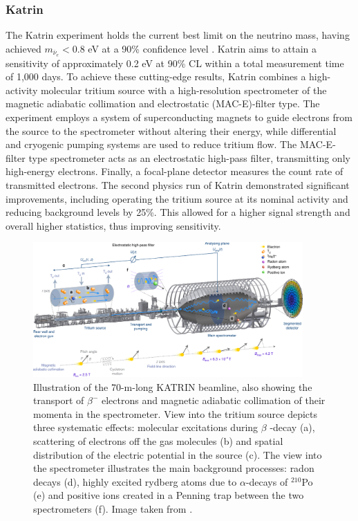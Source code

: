\subsubsection*{Katrin}

The Katrin experiment holds the current best limit on the neutrino mass, having achieved $m_{\overline{\nu}_{e}} < 0.8$ eV at a 90\%
confidence level  \cite{katrin2022direct}. Katrin aims to attain a sensitivity of approximately 0.2 eV at 90\% CL within a total measurement time of 1,000 days.
To achieve these cutting-edge results, Katrin combines a high-activity molecular tritium source with a high-resolution
spectrometer of the magnetic adiabatic collimation and electrostatic (MAC-E)-filter type. The experiment employs a
system of superconducting magnets to guide electrons from the source to the spectrometer without altering their
energy, while differential and cryogenic pumping systems are used to reduce tritium flow. The MAC-E-filter type
spectrometer acts as an electrostatic high-pass filter, transmitting only high-energy electrons. Finally, a focal-plane
detector measures the count rate of transmitted electrons.
The second physics run of Katrin demonstrated significant improvements, including operating the tritium source at
its nominal activity and reducing background levels by 25\%. This allowed for a higher signal strength and overall higher statistics, thus improving sensitivity.

\begin{figure}[t]
  \centering
  \includegraphics[width=0.92\textwidth]{figures/ch1/katrin.pdf}
  \caption{Illustration of the 70-m-long KATRIN beamline, also showing the transport of $\beta^-$ electrons and magnetic adiabatic 
collimation of their momenta in the spectrometer. View into the tritium source depicts three systematic effects:
molecular excitations during $\beta$ -decay (a), 
scattering of electrons off the gas molecules (b) and spatial distribution of the electric potential in the source (c). The view into the spectrometer 
illustrates the main background processes: radon decays (d), highly excited rydberg atoms 
due to $\alpha$-decays of $^{210}$Po (e) and positive ions created in a Penning trap between the two spectrometers 
(f). Image taken from  \cite{katrin2022direct}.}
  \label{fig:katrin}
\end{figure}
